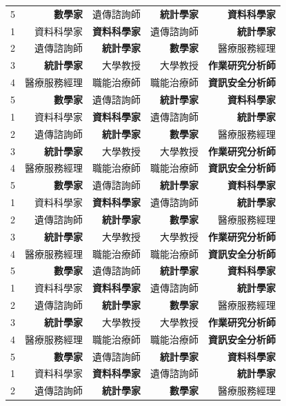 \documentclass[utf8,12pt]{article} %
\begin{document}
\begin{longtable}{@{}crrrr@{}}
5 & \textbf{數學家} & 遺傳諮詢師 & \textbf{統計學家} & \textbf{資料科學家} \\
1 & { 資料科學家} & \textbf{資料科學家}  &  遺傳諮詢師 & \textbf{統計學家} \\
2 & 遺傳諮詢師 & \textbf{統計學家} & \textbf{數學家}  & 醫療服務經理 \\
3 & \textbf{統計學家} & 大學教授  & 大學教授 & \textbf{作業研究分析師}\\
4 & 醫療服務經理 & 職能治療師  & 職能治療師 & \textbf{資訊安全分析師} \\
5 & \textbf{數學家} & 遺傳諮詢師 & \textbf{統計學家} & \textbf{資料科學家} \\
1 & { 資料科學家} & \textbf{資料科學家}  &  遺傳諮詢師 & \textbf{統計學家} \\
2 & 遺傳諮詢師 & \textbf{統計學家} & \textbf{數學家}  & 醫療服務經理 \\
3 & \textbf{統計學家} & 大學教授  & 大學教授 & \textbf{作業研究分析師}\\
4 & 醫療服務經理 & 職能治療師  & 職能治療師 & \textbf{資訊安全分析師} \\
5 & \textbf{數學家} & 遺傳諮詢師 & \textbf{統計學家} & \textbf{資料科學家} \\
1 & { 資料科學家} & \textbf{資料科學家}  &  遺傳諮詢師 & \textbf{統計學家} \\
2 & 遺傳諮詢師 & \textbf{統計學家} & \textbf{數學家}  & 醫療服務經理 \\
3 & \textbf{統計學家} & 大學教授  & 大學教授 & \textbf{作業研究分析師}\\
4 & 醫療服務經理 & 職能治療師  & 職能治療師 & \textbf{資訊安全分析師} \\
5 & \textbf{數學家} & 遺傳諮詢師 & \textbf{統計學家} & \textbf{資料科學家} \\
1 & { 資料科學家} & \textbf{資料科學家}  &  遺傳諮詢師 & \textbf{統計學家} \\
2 & 遺傳諮詢師 & \textbf{統計學家} & \textbf{數學家}  & 醫療服務經理 \\
3 & \textbf{統計學家} & 大學教授  & 大學教授 & \textbf{作業研究分析師}\\
4 & 醫療服務經理 & 職能治療師  & 職能治療師 & \textbf{資訊安全分析師} \\
5 & \textbf{數學家} & 遺傳諮詢師 & \textbf{統計學家} & \textbf{資料科學家} \\
1 & { 資料科學家} & \textbf{資料科學家}  &  遺傳諮詢師 & \textbf{統計學家} \\
2 & 遺傳諮詢師 & \textbf{統計學家} & \textbf{數學家}  & 醫療服務經理 \\

\end{longtable}
\end{document}
